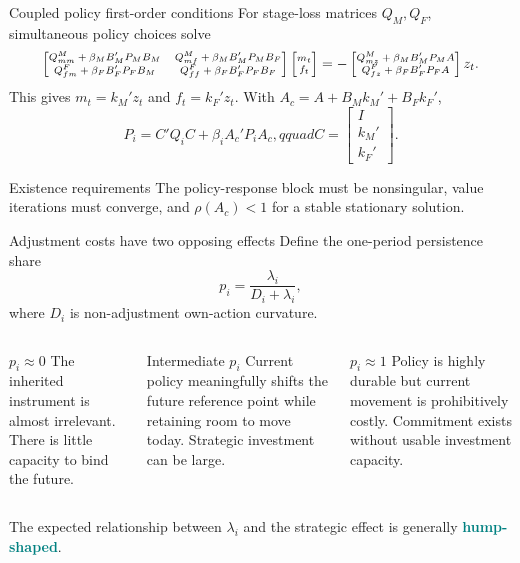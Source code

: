 \documentclass[10pt,aspectratio=169]{beamer}
\newcommand{\key}[1]{\textcolor{teal}{\textbf{#1}}}
\begin{document}
\begin{frame}{Coupled policy first-order conditions}
For stage-loss matrices $Q_M,Q_F$, simultaneous policy choices solve
\begin{equation*}\scriptsize
\begin{bmatrix}
Q^M_{mm}+\beta_MB_M'P_MB_M & Q^M_{mf}+\beta_MB_M'P_MB_F\\
Q^F_{fm}+\beta_FB_F'P_FB_M & Q^F_{ff}+\beta_FB_F'P_FB_F
\end{bmatrix}
\begin{bmatrix}m_t\\f_t\end{bmatrix}
=-
\begin{bmatrix}
Q^M_{mz}+\beta_MB_M'P_MA\\
Q^F_{fz}+\beta_FB_F'P_FA
\end{bmatrix}z_t.
\end{equation*}
This gives $m_t=k_M'z_t$ and $f_t=k_F'z_t$. With
$A_c=A+B_Mk_M'+B_Fk_F'$,
\begin{equation*}
P_i=C'Q_iC+\beta_iA_c'P_iA_c,qquad
C=\begin{bmatrix}I\\k_M'\\k_F'\end{bmatrix}.
\end{equation*}
\begin{alertblock}{Existence requirements}
The policy-response block must be nonsingular, value iterations must converge,
and $\rho(A_c)<1$ for a stable stationary solution.
\end{alertblock}
\end{frame}

\begin{frame}{Adjustment costs have two opposing effects}
Define the one-period persistence share
\begin{equation*}
p_i=\frac{\lambda_i}{D_i+\lambda_i},
\end{equation*}
where $D_i$ is non-adjustment own-action curvature.
\begin{columns}[T,onlytextwidth]
\begin{block}{$p_i\approx0$}
The inherited instrument is almost irrelevant. There is little capacity to
bind the future.
\end{block}
\begin{alertblock}{Intermediate $p_i$}
Current policy meaningfully shifts the future reference point while retaining
room to move today. Strategic investment can be large.
\end{alertblock}
\begin{block}{$p_i\approx1$}
Policy is highly durable but current movement is prohibitively costly.
Commitment exists without usable investment capacity.
\end{block}
\end{columns}
\vfill
\centering The expected relationship between $\lambda_i$ and the strategic
effect is generally \key{hump-shaped}.
\end{frame}
\end{document}
